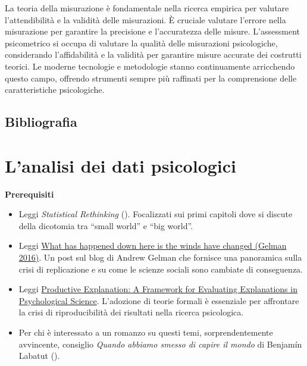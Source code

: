 \documentclass[
  letterpaper,
  DIV=11,
  numbers=noendperiod]{scrreprt}
\providecommand{\tightlist}{%
  \setlength{\itemsep}{0pt}\setlength{\parskip}{0pt}}\usepackage{longtable,booktabs,array}
\theoremstyle{definition}
\theoremstyle{remark}
\begin{document}
La teoria della misurazione è fondamentale nella ricerca empirica per
valutare l'attendibilità e la validità delle misurazioni. È cruciale
valutare l'errore nella misurazione per garantire la precisione e
l'accuratezza delle misure. L'assessment psicometrico si occupa di
valutare la qualità delle misurazioni psicologiche, considerando
l'affidabilità e la validità per garantire misure accurate dei costrutti
teorici. Le moderne tecnologie e metodologie stanno continuamente
arricchendo questo campo, offrendo strumenti sempre più raffinati per la
comprensione delle caratteristiche psicologiche.

\section*{Bibliografia}\label{bibliografia-2}


\chapter{L'analisi dei dati psicologici}\label{sec-data-science}

\textbf{Prerequisiti}

\begin{itemize}
\tightlist
\item
  Leggi \emph{Statistical Rethinking}
  (). Focalizzati
  sui primi capitoli dove si discute della dicotomia tra ``small world''
  e ``big world''.
\item
  Leggi
  \href{https://statmodeling.stat.columbia.edu/2016/09/21/what-has-happened-down-here-is-the-winds-have-changed/}{What
  has happened down here is the winds have changed (Gelman 2016)}. Un
  post sul blog di Andrew Gelman che fornisce una panoramica sulla crisi
  di replicazione e su come le scienze sociali sono cambiate di
  conseguenza.
\item
  Leggi
  \href{https://psycnet.apa.org/fulltext/2025-04988-001.html}{Productive
  Explanation: A Framework for Evaluating Explanations in Psychological
  Science}. L'adozione di teorie formali è essenziale per affrontare la
  crisi di riproducibilità dei risultati nella ricerca psicologica.
\item
  Per chi è interessato a un romanzo su questi temi, sorprendentemente
  avvincente, consiglio \emph{Quando abbiamo smesso di capire il mondo}
  di Benjamín Labatut ().
\end{itemize}
\end{document}
